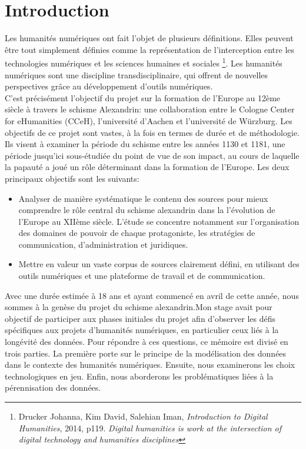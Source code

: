 \chapter{Introduction}

Les humanités numériques ont fait l’objet de plusieurs définitions. Elles peuvent être tout simplement définies comme la représentation de l’interception entre les technologies numériques et les sciences humaines et sociales \footnote{Drucker Johanna, Kim David, Salehian Iman, \textit{Introduction to Digital Humanities}, 2014, p119. \og \textit{Digital humanities is work at the intersection of digital technology and humanities disciplines} \fg{}}. Les humanités numériques sont une discipline transdisciplinaire, qui offrent de nouvelles perspectives grâce au développement d’outils numériques.\\
C'est précisément l'objectif du projet sur la formation de l'Europe au 12ème siècle à travers le schisme Alexandrin:  une collaboration entre le Cologne Center for eHumanities (CCeH), l'université d'Aachen et l'université de Würzburg. Les objectifs de ce projet sont vastes, à la fois en termes de durée et de méthodologie. Ils visent à examiner la période du schisme entre les années 1130 et 1181, une période jusqu'ici sous-étudiée du point de vue de son impact, au cours de laquelle la papauté a joué un rôle déterminant dans la formation de l'Europe. Les deux principaux objectifs sont les suivants:\\
\begin{itemize}
    \item Analyser de manière systématique le contenu des sources pour mieux comprendre le rôle central du schisme alexandrin dans la l'évolution  de l'Europe au XIIème siècle. L'étude se concentre notamment sur l'organisation des domaines de pouvoir de chaque protagoniste, les stratégies de communication, d'administration et juridiques.
    \item Mettre en valeur un vaste corpus de sources clairement défini, en utilisant des outils numériques et une plateforme de travail et de communication.\\
\end{itemize}

Avec une durée estimée à 18 ans et ayant commencé en avril de cette année, nous sommes à la genèse du projet du schisme alexandrin.Mon stage avait pour objectif de participer aux phases initiales du projet afin d'observer les défis spécifiques aux projets d’humanités numériques, en particulier ceux liés à la longévité des données. Pour répondre à ces questions, ce mémoire est divisé en trois parties. La première porte sur le principe de la modélisation des données dans le contexte des humanités numériques. Ensuite, nous examinerons les choix technologiques en jeu. Enfin, nous aborderons les problématiques liées à la pérennisation des données.


